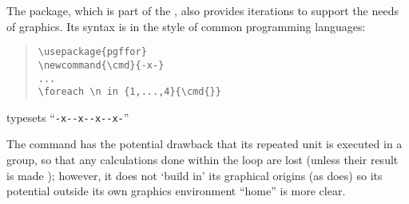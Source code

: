 The  package, which is part of the %
, also
provides iterations to support the needs of graphics.  Its syntax is
in the style of common programming languages:
\begin{quote}
\begin{verbatim}
\usepackage{pgffor}
\newcommand{\cmd}{-x-}
...
\foreach \n in {1,...,4}{\cmd{}}
\end{verbatim}
\end{quote}
typesets ``\texttt{-x-\relax-x-\relax-x-\relax-x-}''

The  command has the potential drawback that its repeated
unit is executed in a group, so that any calculations done within the
loop are lost (unless their result is made ); however, it
does not `build in' its graphical origins (as  does) so
its potential outside its own graphics environment ``home'' is more
clear.
%
%
%
% 
%
%

